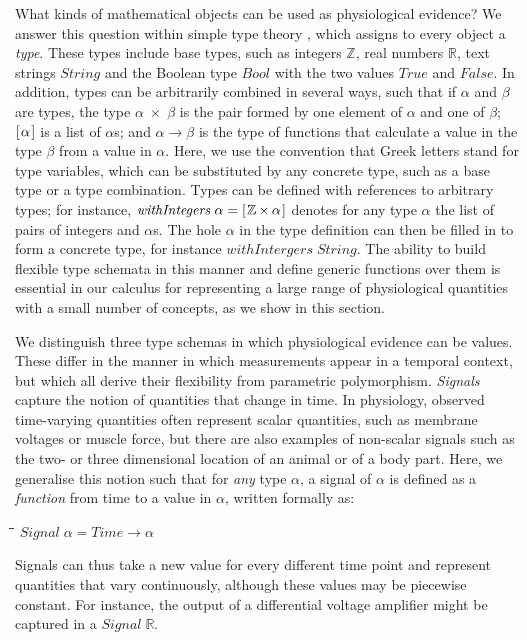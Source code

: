 \documentclass[11pt]{article}
\newlength{\lwidth}\setlength{\lwidth}{4.5cm}
\newlength{\cwidth}\setlength{\cwidth}{8mm} %
\newcommand{\Conid}[1]{\mathit{#1}}
\newcommand{\Varid}[1]{\mathit{#1}}
\begin{document}
What kinds of mathematical objects can be used as physiological
evidence? We answer this question within simple type theory
\cite{Pierce2002, Hindley2008}, which assigns to every object a \emph{type}. These
types include base types, such as integers \ensuremath{\mathbb{Z}}, real numbers
\ensuremath{\mathbb{R}}, text strings \ensuremath{\Conid{String}} and the Boolean type \ensuremath{\Conid{Bool}} with the two
values \ensuremath{\Conid{True}} and \ensuremath{\Conid{False}}. In addition, types can be arbitrarily
combined in several ways, such that if \ensuremath{\alpha} and \ensuremath{\beta} are types,
the type \ensuremath{\alpha\;\!\!\times\!\!\;\beta} is the pair formed by one element of
\ensuremath{\alpha} and one of \ensuremath{\beta}; \ensuremath{[\mskip1.5mu \alpha\mskip1.5mu]} is a list of \ensuremath{\alpha}s; and \ensuremath{\alpha\to \beta} is the type of functions that calculate a value in the type
\ensuremath{\beta} from a value in \ensuremath{\alpha}. Here, we use the convention that Greek
letters stand for type variables, which can be substituted by any
concrete type, such as a base type or a type combination. Types can be
defined with references to arbitrary types; for instance,
\ensuremath{\Varid{withIntegers}\;\alpha\mathrel{=}[\mskip1.5mu \mathbb{Z}\;\!\!\times\!\!\;\alpha\mskip1.5mu]} denotes for any type
\ensuremath{\alpha} the list of pairs of integers and \ensuremath{\alpha}s. The hole \ensuremath{\alpha}
in the type definition can then be filled in to form a concrete type,
for instance \ensuremath{\Varid{withIntergers}\;\Conid{String}}. The ability to build flexible
type schemata in this manner and define generic functions over them
\cite[``parametric polymorphism'';][]{Pierce2002} is essential in our
calculus for representing a large range of physiological quantities
with a small number of concepts, as we show in this section.

We distinguish three type schemas in which physiological evidence can
be values. These differ in the manner in which measurements appear in
a temporal context, but which all derive their flexibility from
parametric polymorphism. \emph{Signals} capture the notion of
quantities that change in time. In physiology, observed time-varying
quantities often represent scalar quantities, such as membrane
voltages or muscle force, but there are also examples of non-scalar
signals such as the two- or three dimensional location of an animal or
of a body part. Here, we generalise this notion such that for
\emph{any} type \ensuremath{\alpha}, a signal of \ensuremath{\alpha} is defined as a
\emph{function} from time to a value in \ensuremath{\alpha}, written formally as:
\begin{tabbing}
\qquad\=\hspace{\lwidth}\=\hspace{\cwidth}\=\+\kill
${\Conid{Signal}\;\alpha\mathrel{=}\Conid{Time}\to \alpha}$
\end{tabbing}Signals can thus take a new value for every different time point and
represent quantities that vary continuously, although these values may
be piecewise constant. For instance, the output of a differential
voltage amplifier might be captured in a \ensuremath{\Conid{Signal}\;\mathbb{R}}.
\end{document}
